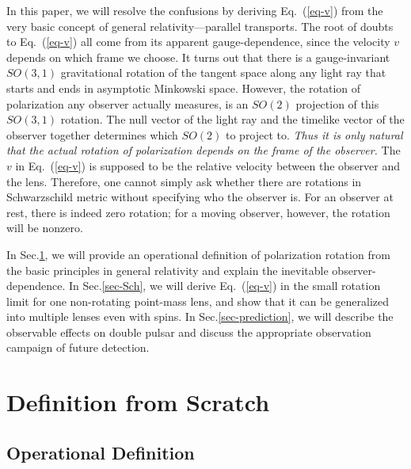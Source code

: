 \documentclass[aps,showpacs,twocolumn,floats,prd,superscriptaddress,nofootinbib]{revtex4}
\begin{document}
In this paper, we will resolve the confusions by deriving Eq.~(\ref{eq-v}) from the very basic concept of general relativity---parallel transports. 
The root of doubts to Eq.~(\ref{eq-v}) all come from its apparent gauge-dependence, since the velocity $v$ depends on which frame we choose. 
It turns out that there is a gauge-invariant $SO(3,1)$ gravitational rotation of the tangent space along any light ray that starts and ends in asymptotic Minkowski space. 
However, the rotation of polarization any observer actually measures, is an $SO(2)$ projection of this $SO(3,1)$ rotation. 
The null vector of the light ray and the timelike vector of the observer together determines which $SO(2)$ to project to.
 {\it Thus it is only natural that the actual rotation of polarization depends on the frame of the observer. }
The $v$ in Eq.~(\ref{eq-v}) is supposed to be the relative velocity between the observer and the lens.
Therefore, one cannot simply ask whether there are rotations in Schwarzschild metric without specifying who the observer is.
For an observer at rest, there is indeed zero rotation; 
for a moving observer, however, the rotation will be nonzero.

In Sec.\ref{sec-born}, we will provide an operational definition of polarization rotation from the basic principles in general relativity and explain the inevitable observer-dependence.
In Sec.\ref{sec-Sch}, we will derive Eq.~(\ref{eq-v}) in the small rotation limit for one non-rotating point-mass lens, and show that it can be generalized into multiple lenses even with spins.
In Sec.\ref{sec-prediction}, we will describe the observable effects on double pulsar and discuss the appropriate observation campaign of future detection.

\section{Definition from Scratch}
\label{sec-born}

\subsection{Operational Definition}
\end{document}
